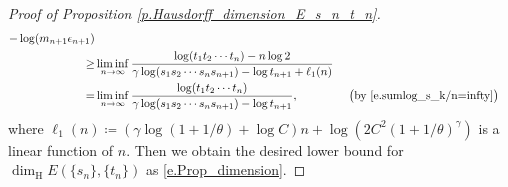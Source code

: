 \documentclass[12pt,reqno]{amsart}
\renewcommand{\=}{\coloneqq}
\theoremstyle{plain}
\begin{document}
\begin{proof}[Proof of Proposition \ref{p.Hausdorff_dimension_E_s_n_t_n}]
\begin{alignat*}{2}
                {-\log (m_{n+1}\epsilon_{n+1})}\\
                \geq&  \liminf_{n\to \infty}
                \frac{\log (t_1t_2\cdots t_n)-n\log 2}
                {\gamma \log(s_1s_2\cdots s_ns_{n+1})-\log t_{n+1}
                +\ell_1(n)} \\
                =& \liminf_{n\to \infty}
                \frac{\log (t_1t_2\cdots t_n)}
                {\gamma\log(s_1s_2\cdots s_ns_{n+1})-\log t_{n+1}},
                && \  \big(\text{by}\ \eqref{e.sumlog_s_k/n=infty}\big)
        \end{alignat*}
        where $\ell_1(n)\coloneqq \left(\gamma \log(1+1/\theta)+\log C\right)n+\log\left(2C^2(1+1/\theta)^{\gamma}\right)$ is a linear function of $n$.
Then we obtain the desired lower bound for $\dim_{\mathrm{H}}E(\{s_n\},\{t_n\})$ as \eqref{e.Prop_dimension}.



\end{proof}
\end{document}
